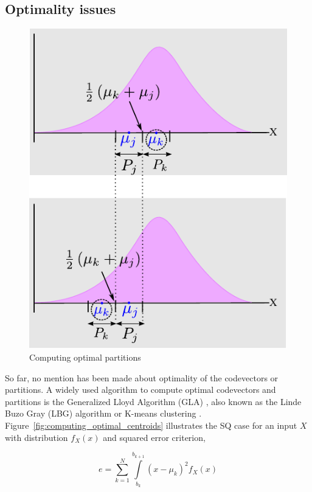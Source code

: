 \subsection{Optimality issues}
\begin{figure}[t]		
	\center	
	\includegraphics[height=0.5\textheight]{thesis/Quantization_optimalPartitions2.pdf}
	\caption{Computing optimal partitions}
	\label{fig:computing_optimal_partitions}
\end{figure}

So far, no mention has been made about optimality of the codevectors or partitions.  A widely used algorithm to compute optimal codevectors and partitions is the Generalized Lloyd Algorithm (GLA) \cite{1991_BOOK_VQ_GershoGray}, also known as the Linde Buzo Gray (LBG) algorithm \cite{1982_JNL_LeastSquaresQuantization_Lloyd} or K-means clustering \cite{1967_CNF_Kmeans_Macqueen}.  Figure~\ref{fig:computing_optimal_centroids} illustrates the SQ case for an input $X$ with distribution $f_X(x)$ and squared error criterion, 

\begin{equation}
e=\sum\limits_{k=1}^{N} \int\limits_{b_k}^{b_{k+1}}(x-\mu_k)^2f_X(x)
\end{equation}

